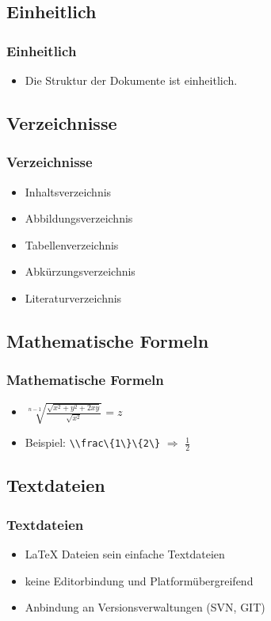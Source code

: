 \documentclass[xcolor=dvipsnames]{beamer}
\begin{document}
\subsection{Einheitlich}
\begin{frame}
  \frametitle{Einheitlich}
	\begin{block}{}	
		\begin{itemize}
  			\item Die Struktur der Dokumente ist einheitlich.
		\end{itemize}
	\end{block}	
\end{frame}

\subsection{Verzeichnisse}
\begin{frame}
  \frametitle{Verzeichnisse}
	\begin{block}{}	
		\begin{itemize}
  			\item Inhaltsverzeichnis
  			\item Abbildungsverzeichnis
  			\item Tabellenverzeichnis
	  		\item Abkürzungsverzeichnis
  			\item Literaturverzeichnis
		\end{itemize}
	\end{block}			
\end{frame}

\subsection{Mathematische Formeln}
\begin{frame}
  \frametitle{Mathematische Formeln}
	\begin{block}{}	
		\begin{itemize}
  			\item $\sqrt[n-1] {\frac{\sqrt{x^2+y^2+2xy}}{\sqrt{x^2}}} = z$ \pause
	  		\item Beispiel: \lstinline!\\frac\{1\}\{2\}! $\Rightarrow$ $\frac{1}{2}$ 
		\end{itemize}
	\end{block}			
\end{frame}

\subsection{Textdateien}
\begin{frame}
  \frametitle{Textdateien}
	\begin{block}{}	
		\begin{itemize}
  			\item \LaTeX{} Dateien sein einfache Textdateien
  			\item keine Editorbindung und Platformübergreifend
	  		\item Anbindung an Versionsverwaltungen (SVN, GIT)
		\end{itemize}
	\end{block}	
\end{frame}
\end{document}

